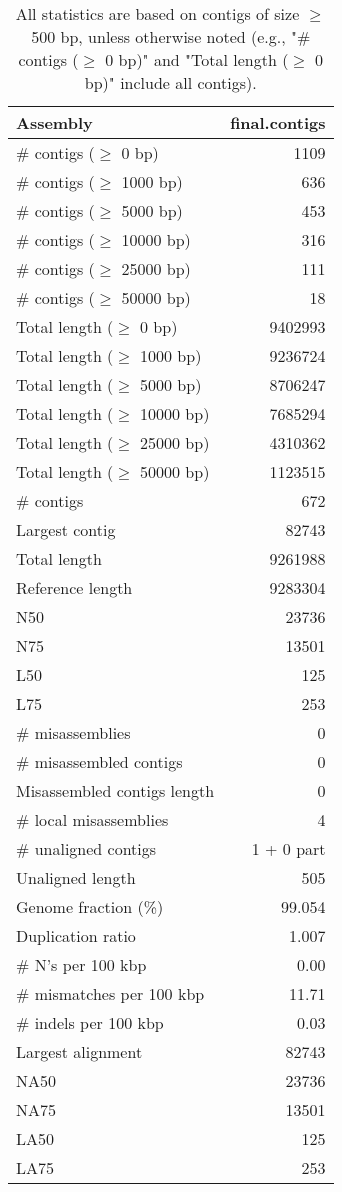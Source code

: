 \documentclass[12pt,a4paper]{article}
\begin{document}
\begin{table}[ht]
\begin{center}
\caption{All statistics are based on contigs of size $\geq$ 500 bp, unless otherwise noted (e.g., "\# contigs ($\geq$ 0 bp)" and "Total length ($\geq$ 0 bp)" include all contigs).}
\begin{tabular}{|l*{1}{|r}|}
\hline
Assembly & final.contigs \\ \hline
\# contigs ($\geq$ 0 bp) & 1109 \\ \hline
\# contigs ($\geq$ 1000 bp) & 636 \\ \hline
\# contigs ($\geq$ 5000 bp) & 453 \\ \hline
\# contigs ($\geq$ 10000 bp) & 316 \\ \hline
\# contigs ($\geq$ 25000 bp) & 111 \\ \hline
\# contigs ($\geq$ 50000 bp) & 18 \\ \hline
Total length ($\geq$ 0 bp) & 9402993 \\ \hline
Total length ($\geq$ 1000 bp) & 9236724 \\ \hline
Total length ($\geq$ 5000 bp) & 8706247 \\ \hline
Total length ($\geq$ 10000 bp) & 7685294 \\ \hline
Total length ($\geq$ 25000 bp) & 4310362 \\ \hline
Total length ($\geq$ 50000 bp) & 1123515 \\ \hline
\# contigs & 672 \\ \hline
Largest contig & 82743 \\ \hline
Total length & 9261988 \\ \hline
Reference length & 9283304 \\ \hline
N50 & 23736 \\ \hline
N75 & 13501 \\ \hline
L50 & 125 \\ \hline
L75 & 253 \\ \hline
\# misassemblies & 0 \\ \hline
\# misassembled contigs & 0 \\ \hline
Misassembled contigs length & 0 \\ \hline
\# local misassemblies & 4 \\ \hline
\# unaligned contigs & 1 + 0 part \\ \hline
Unaligned length & 505 \\ \hline
Genome fraction (\%) & 99.054 \\ \hline
Duplication ratio & 1.007 \\ \hline
\# N's per 100 kbp & 0.00 \\ \hline
\# mismatches per 100 kbp & 11.71 \\ \hline
\# indels per 100 kbp & 0.03 \\ \hline
Largest alignment & 82743 \\ \hline
NA50 & 23736 \\ \hline
NA75 & 13501 \\ \hline
LA50 & 125 \\ \hline
LA75 & 253 \\ \hline
\end{tabular}
\end{center}
\end{table}
\end{document}
